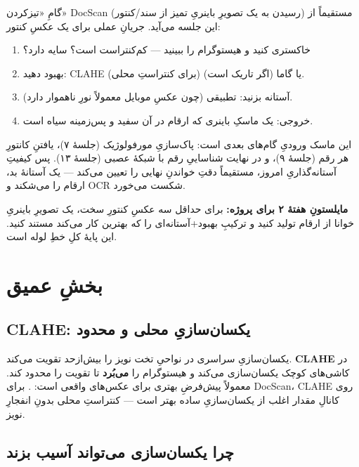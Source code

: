 \documentclass[12pt,a4paper]{article}
\begin{document}
گامِ «تیزکردن»ِ DocScan (رسیدن به یک تصویرِ باینریِ تمیز از سند/کنتور) مستقیماً از این جلسه
می‌آید. جریانِ عملی برای یک عکسِ کنتور:

\begin{enumerate}
  \item خاکستری کنید و هیستوگرام را ببینید — کم‌کنتراست است؟ سایه دارد؟
  \item بهبود دهید: CLAHE (برای کنتراستِ محلی) یا گاما (اگر تاریک است).
  \item آستانه بزنید: تطبیقی (چون عکسِ موبایل معمولاً نورِ ناهموار دارد).
  \item خروجی: یک ماسکِ باینری که ارقام در آن سفید و پس‌زمینه سیاه است.
\end{enumerate}

این ماسک ورودیِ گام‌های بعدی است: پاک‌سازیِ مورفولوژیک (جلسهٔ ۷)، یافتنِ کانتورِ هر رقم (جلسهٔ ۹)،
و در نهایت شناساییِ رقم با شبکهٔ عصبی (جلسهٔ ۱۳). پس کیفیتِ آستانه‌گذاریِ امروز، مستقیماً دقتِ
خواندنِ نهایی را تعیین می‌کند — یک آستانهٔ بد، ارقام را می‌شکند و OCR شکست می‌خورد.

\begin{yaddasht}
\textbf{مایلستونِ هفتهٔ ۲ برای پروژه:} برای حداقل سه عکسِ کنتورِ سخت، یک تصویرِ باینریِ خوانا از
ارقام تولید کنید و ترکیبِ بهبود+آستانه‌ای را که بهترین کار می‌کند مستند کنید. این پایهٔ کلِ خطِ
لوله است.
\end{yaddasht}

\section{بخشِ عمیق}

\subsection{CLAHE: یکسان‌سازیِ محلی و محدود}

یکسان‌سازیِ سراسری در نواحیِ تخت نویز را بیش‌ازحد تقویت می‌کند. \textbf{CLAHE} در کاشی‌های کوچک
یکسان‌سازی می‌کند و هیستوگرام را \textbf{می‌بُرد} تا تقویت را محدود کند. معمولاً پیش‌فرضِ بهتری
برای عکس‌های واقعی است: . برای DocScan، CLAHE روی کانالِ
مقدار اغلب از یکسان‌سازیِ ساده بهتر است — کنتراستِ محلی بدونِ انفجارِ نویز.

\subsection{چرا یکسان‌سازی می‌تواند آسیب بزند}
\end{document}
